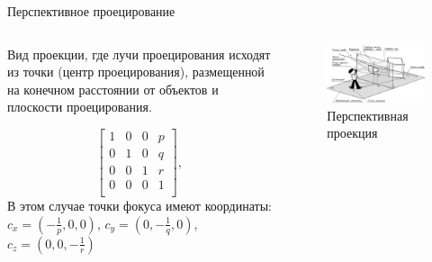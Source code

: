 \documentclass{beamer}
\begin{document}
	\begin{frame}{Перспективное проецирование}

		\begin{columns}
			\begin{column}{0.45\textwidth}
				Вид проекции, где лучи проецирования исходят из точки (центр проецирования), размещенной на конечном расстоянии от объектов и плоскости проецирования.
	
				\[
					\begin{bmatrix}
						1 & 0 & 0 & p \\
						0 & 1 & 0 & q \\
						0 & 0 & 1 & r \\
						0 & 0 & 0 & 1 \\
					\end{bmatrix}	
					,
				\]
					В этом случае точки фокуса имеют координаты:
					$c_x = (- \frac{1}{p},0,0)$, $c_y = (0,- \frac{1}{q},0)$, $c_z =(0,0, - \frac{1}{r})$
		\end{column}
		\begin{column}{0.55\textwidth}
			\begin{figure} 
					\includegraphics[width=\textwidth]{images/perspective_projections.png}
				\caption{Перспективная проекция}
			\end{figure}
		\end{column}
	\end{columns}


\end{frame}
\end{document}
